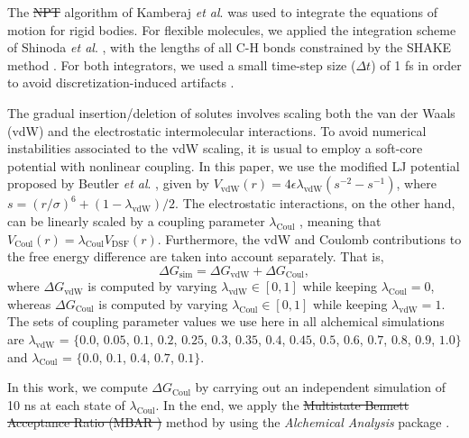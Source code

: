 \documentclass[3p,twocolumn]{elsarticle}
\providecommand{\DIFadd}[1]{{\protect\color{blue}\uwave{#1}}} %
\providecommand{\DIFdel}[1]{{\protect\color{red}\sout{#1}}}                      %
\providecommand{\DIFaddbegin}{} %
\providecommand{\DIFaddend}{} %
\providecommand{\DIFdelbegin}{} %
\providecommand{\DIFdelend}{} %
\newcommand{\DIFscaledelfig}{0.5}
\newlength{\DIFdelgraphicswidth} %
\newlength{\DIFdelgraphicsheight} %
\newcommand{\DIFaddincludegraphics}[2][]{{\color{blue}\fbox{\DIFOincludegraphics[#1]{#2}}}} %
\newcommand{\DIFdelincludegraphics}[2][]{%
\sbox{\DIFdelgraphicsbox}{\DIFOincludegraphics[#1]{#2}}%
\settoboxwidth{\DIFdelgraphicswidth}{\DIFdelgraphicsbox} %
\settoboxtotalheight{\DIFdelgraphicsheight}{\DIFdelgraphicsbox} %
\scalebox{\DIFscaledelfig}{%
\parbox[b]{\DIFdelgraphicswidth}{\usebox{\DIFdelgraphicsbox}\\[-\baselineskip] \rule{\DIFdelgraphicswidth}{0em}}\llap{\resizebox{\DIFdelgraphicswidth}{\DIFdelgraphicsheight}{%
\setlength{\unitlength}{\DIFdelgraphicswidth}%
\begin{picture}(1,1)%
\thicklines\linethickness{2pt} %
{\color[rgb]{1,0,0}\put(0,0){\framebox(1,1){}}}%
{\color[rgb]{1,0,0}\put(0,0){\line( 1,1){1}}}%
{\color[rgb]{1,0,0}\put(0,1){\line(1,-1){1}}}%
\end{picture}%
}\hspace*{3pt}}} %
} %
\DeclareRobustCommand{\DIFaddbegin}{\DIFOaddbegin \let\includegraphics\DIFaddincludegraphics} %
\DeclareRobustCommand{\DIFaddend}{\DIFOaddend \let\includegraphics\DIFOincludegraphics} %
\DeclareRobustCommand{\DIFdelbegin}{\DIFOdelbegin \let\includegraphics\DIFdelincludegraphics} %
\DeclareRobustCommand{\DIFdelend}{\DIFOaddend \let\includegraphics\DIFOincludegraphics} %
\begin{document}
The \DIFdelbegin \DIFdel{NPT }\DIFdelend \DIFaddbegin \DIFadd{NpT }\DIFaddend algorithm of Kamberaj \textit{et al}. \cite{Kamberaj_2005} was used to integrate the equations of motion for rigid bodies.
For flexible molecules, we applied the integration scheme of Shinoda \textit{et al}. \cite{Shinoda2004}, with the lengths of all C-H bonds constrained by the SHAKE method \cite{Ryckaert1977}.
For both integrators, we used a small time-step size ($\Delta t$) of 1 fs in order to avoid discretization-induced artifacts \cite{Eastwood_2010, Silveira_2017}.

The gradual insertion/deletion of solutes involves scaling both the van der Waals (vdW) and the electrostatic intermolecular interactions.
To avoid numerical instabilities associated to the vdW scaling, it is usual to employ a soft-core potential with nonlinear coupling.
In this paper, we use the modified LJ potential proposed by Beutler \textit{et al}. \cite{Beutler_1994}, given by $V_\text{vdW}(r) = 4 \epsilon \lambda_\text{vdW} (s^{-2} - s^{-1})$, where $s = (r/\sigma)^6 + (1 - \lambda_\text{vdW})/2$.
The electrostatic interactions, on the other hand, can be linearly scaled by a coupling parameter $\lambda_\text{Coul}$ \cite{Naden_2015}, meaning that $V_\text{Coul}(r) = \lambda_\text{Coul} V_\text{DSF}(r)$.
Furthermore, the vdW and Coulomb contributions to the free energy difference are taken into account separately.
That is,
\begin{equation}
\Delta G_\text{sim} = \Delta G_\text{vdW} + \Delta G_\text{Coul},
\end{equation}
where $\Delta G_\text{vdW}$ is computed by varying $\lambda_\text{vdW} \in [0,1]$ while keeping $\lambda_\text{Coul} = 0$, whereas $\Delta G_\text{Coul}$ is computed by varying $\lambda_\text{Coul} \in [0,1]$ while keeping $\lambda_\text{vdW} = 1$.
The sets of coupling parameter values we use here in all alchemical simulations are $\lambda_{\text{vdW}}$ = $\{0.0$, $0.05$, $0.1$, $0.2$, $0.25$, $0.3$, $0.35$, $0.4$, $0.45$, $0.5$, $0.6$, $0.7$, $0.8$, $0.9$, $1.0\}$ and $\lambda_{\text{Coul}}$ = $\{0.0$, $0.1$, $0.4$, $0.7$, $0.1\}$.

In this work, we compute $\Delta G_\text{Coul}$ by carrying out an independent simulation of 10 ns at each state of $\lambda_{\text{Coul}}$.
In the end, we apply the \DIFdelbegin \DIFdel{Multistate Bennett Acceptance Ratio (MBAR ) }\DIFdelend \DIFaddbegin \DIFadd{MBAR }\DIFaddend method \cite{Shirts_2008} by using the \textit{Alchemical Analysis} package \cite{Klimovich_2015}.
\end{document}
